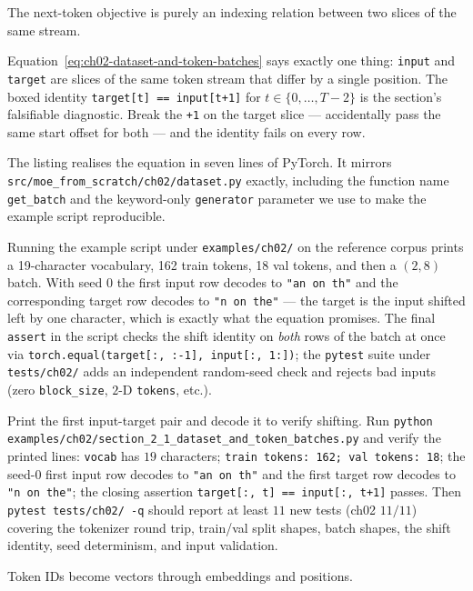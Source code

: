 

The next-token objective is purely an indexing relation between two slices of the same stream.



Equation~\ref{eq:ch02-dataset-and-token-batches} says exactly one thing: \texttt{input} and \texttt{target} are slices of the same token stream that differ by a single position. The boxed identity \texttt{target[t] == input[t+1]} for $t \in \{0, \dots, T{-}2\}$ is the section's falsifiable diagnostic. Break the \texttt{+1} on the target slice --- accidentally pass the same start offset for both --- and the identity fails on every row.

The listing realises the equation in seven lines of PyTorch. It mirrors \texttt{src/moe\_from\_scratch/ch02/dataset.py} exactly, including the function name \texttt{get\_batch} and the keyword-only \texttt{generator} parameter we use to make the example script reproducible.



Running the example script under \texttt{examples/ch02/} on the reference corpus prints a 19-character vocabulary, 162 train tokens, 18 val tokens, and then a $(2, 8)$ batch. With seed $0$ the first input row decodes to \texttt{"an on th"} and the corresponding target row decodes to \texttt{"n on the"} --- the target is the input shifted left by one character, which is exactly what the equation promises. The final \texttt{assert} in the script checks the shift identity on \emph{both} rows of the batch at once via \texttt{torch.equal(target[:, :-1], input[:, 1:])}; the \texttt{pytest} suite under \texttt{tests/ch02/} adds an independent random-seed check and rejects bad inputs (zero \texttt{block\_size}, $2$-D \texttt{tokens}, etc.).

\begin{checkpointbox}
Print the first input-target pair and decode it to verify shifting. Run \texttt{python examples/ch02/section\_2\_1\_dataset\_and\_token\_batches.py} and verify the printed lines: \texttt{vocab} has $19$ characters; \texttt{train tokens: 162; val tokens: 18}; the seed-$0$ first input row decodes to \texttt{"an on th"} and the first target row decodes to \texttt{"n on the"}; the closing assertion \texttt{target[:, t] == input[:, t+1]} passes. Then \texttt{pytest tests/ch02/ -q} should report at least $11$ new tests (ch02 $11/11$) covering the tokenizer round trip, train/val split shapes, batch shapes, the shift identity, seed determinism, and input validation.
\end{checkpointbox}

Token IDs become vectors through embeddings and positions.
